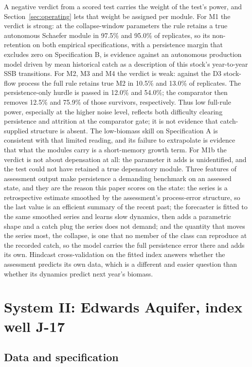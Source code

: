 \documentclass[preprint,11pt,authoryear]{elsarticle}
\theoremstyle{definition}
\theoremstyle{remark}
\begin{document}
A negative verdict from a scored test carries the weight of the test's power, and Section~\ref{sec:operating} lets that weight be assigned per module. For M1 the verdict is strong: at the collapse-window parameters the rule retains a true autonomous Schaefer module in 97.5\% and 95.0\% of replicates, so its non-retention on both empirical specifications, with a persistence margin that excludes zero on Specification B, is evidence against an autonomous production model driven by mean historical catch as a description of this stock's year-to-year SSB transitions. For M2, M3 and M4 the verdict is weak: against the D3 stock-flow process the full rule retains true M2 in 10.5\% and 13.0\% of replicates. The persistence-only hurdle is passed in 12.0\% and 54.0\%; the comparator then removes 12.5\% and 75.9\% of those survivors, respectively. Thus low full-rule power, especially at the higher noise level, reflects both difficulty clearing persistence and attrition at the comparator gate; it is not evidence that catch-supplied structure is absent. The low-biomass skill on Specification A is consistent with that limited reading, and its failure to extrapolate is evidence that what the modules carry is a short-memory growth term. For M1b the verdict is not about depensation at all: the parameter it adds is unidentified, and the test could not have retained a true depensatory module. Three features of assessment output make persistence a demanding benchmark on an assessed state, and they are the reason this paper scores on the state: the series is a retrospective estimate smoothed by the assessment's process-error structure, so the last value is an efficient summary of the recent past; the forecaster is fitted to the same smoothed series and learns slow dynamics, then adds a parametric shape and a catch plug the series does not demand; and the quantity that moves the series most, the collapse, is one that no member of the class can reproduce at the recorded catch, so the model carries the full persistence error there and adds its own. Hindcast cross-validation on the fitted index \citep{Kell2016,Kell2021,Carvalho2021} answers whether the assessment predicts its own data, which is a different and easier question than whether its dynamics predict next year's biomass.
\FloatBarrier
\section{System II: Edwards Aquifer, index well J-17}\label{sec:edwards}

\subsection{Data and specification}\label{sec:edw_data}
\end{document}

